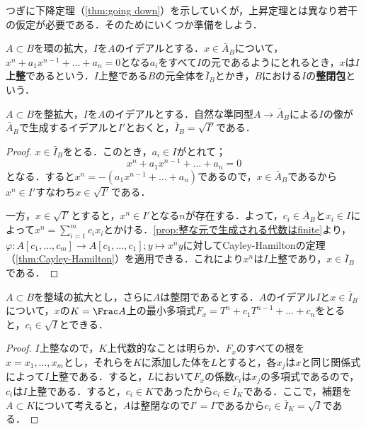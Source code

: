 つぎに下降定理（\ref{thm:going down}）を示していくが，上昇定理とは異なり若干の仮定が必要である．そのためにいくつか準備をしよう．

\begin{defi}
	$A\subset B$を環の拡大，$I$を$A$のイデアルとする．$x\in\bar{A}_B$について，$x^n+a_1x^{n-1}+\dots+a_n=0$となる$a_i$をすべて$I$の元であるようにとれるとき，$x$は$I$\textbf{上整}であるという．$I$上整である$B$の元全体を$\bar{I}_B$とかき，$B$における$I$の\textbf{整閉包}という．
\end{defi}

\begin{lem}\label{lem:イデアルの整閉包と根基}
	$A\subset B$を整拡大，$I$を$A$のイデアルとする．自然な準同型$A\to \bar{A}_B$による$I$の像が$\bar{A}_B$で生成するイデアルと$I'$とおくと，$\bar{I}_B=\sqrt{I'}$である．
\end{lem}

\begin{proof}
	$x\in\bar{I}_B$をとる．このとき，$a_i\in I$がとれて；
	\[x^n+a_1x^{n-1}+\dots+a_n=0\]
	となる．すると$x^n=-(a_1x^{n-1}+\dots+a_n)$であるので，$x\in\bar{A}_B$であるから$x^n\in I'$すなわち$x\in\sqrt{I'}$である．
	
	一方，$x\in\sqrt{I'}$とすると，$x^n\in I'$となる$n$が存在する．よって，$c_i\in\bar{A}_B$と$x_i\in I$によって$x^n=\sum_{i=1}^m c_ix_i$とかける．\ref{prop:整な元で生成される代数はfinite}より，$\varphi:A[c_1,\dots,c_m]\to A[c_1,\dots,c_1];y\mapsto x^ny$に対してCayley-Hamiltonの定理（\ref{thm:Cayley-Hamilton}）を適用できる．これにより$x^n$は$I$上整であり，$x\in\bar{I}_B$である．
\end{proof}

\begin{prop}\label{prop:整なら最小多項式が根基からとれる}
	$A\subset B$を整域の拡大とし，さらに$A$は整閉であるとする．$A$のイデアル$I$と$x\in\bar{I}_B$について，$x$の$K=\Frac A$上の最小多項式$F_x=T^n+c_1T^{n-1}+\dots+c_n$をとると，$c_i\in\sqrt{I}$とできる．
\end{prop}

\begin{proof}
	$I$上整なので，$K$上代数的なことは明らか．$F_x$のすべての根を$x=x_1,\dots,x_m$とし，それらを$K$に添加した体を$L$とすると，各$x_j$は$x$と同じ関係式によって$I$上整である．すると，$L$において$F_x$の係数$c_i$は$x_j$の多項式であるので，$c_i$は$I$上整である．すると，$c_i\in K$であったから$c_i\in\bar{I}_K$である．ここで，補題を$A\subset K$について考えると，$A$は整閉なので$I'=I$であるから$c_i\in\bar{I}_K=\sqrt{I}$である．
\end{proof}

